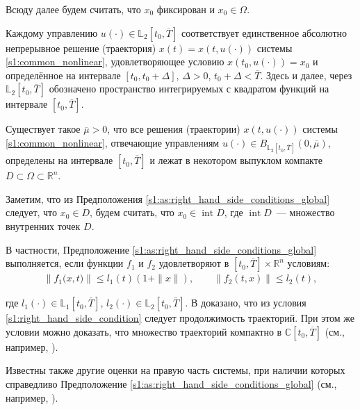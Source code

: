 \documentclass[../main.tex]{subfiles}
\begin{document}
Всюду далее будем считать, что $x_0$ фиксирован и $x_0 \in \Omega $. 
 
Каждому управлению $ u(\cdot) \in \mathbb{L}_2[t_0, \overline{T}] $ соответствует единственное абсолютно непрерывное решение (траектория) $ x(t)=x(t,u(\cdot)) $ системы \eqref{s1:common_nonlinear}, удовлетворяющее условию $ x(t_0, u(\cdot)) = x_0$ и определённое на интервале $ [t_0, t_0 + \Delta] $, $\Delta > 0$, $ t_0 + \Delta < \overline{T}$.
Здесь и далее, через $\mathbb{L}_2[t_0, \overline{T}] $ обозначено пространство интегрируемых с квадратом функций на интервале $[t_0, \overline{T}]$. 

\begin{assumption}\label{s1:as:right_hand_side_conditions_global}
 Существует такое $\overline{\mu} > 0 $, что все решения (траектории) $ x(t, u(\cdot)) $ системы \eqref{s1:common_nonlinear}, отвечающие управлениям $u(\cdot) \in B_{\mathbb{L}_2[t_0, \overline{T}]}(0,\overline{\mu})$, определены на интервале $ [t_0,\overline{T}] $ и лежат в некотором выпуклом компакте $D \subset \Omega \subset \mathbb{R}^n$. 
\end{assumption}
 
Заметим, что из Предположения \ref{s1:as:right_hand_side_conditions_global} следует, что $x_0 \in D$, будем считать, что $x_0 \in \operatorname{int} D$, где $\operatorname{int} D $~--- множество внутренних точек $D$.

В частности, Предположение \ref{s1:as:right_hand_side_conditions_global} выполняется, если функции $f_1$ и $f_2$ удовлетворяют в $ [t_0, \overline{T}] \times \mathbb{R}^n$ условиям:
\begin{gather}\label{s1:right_hand_side_condition}
 \left\|f_1\big(x,t\big) \right\| \leqslant l_1(t) (1 + \|x\|), \qquad \left\| f_2(t,x) \right\| \leqslant l_2(t), 
\end{gather}
 
где $ l_1(\cdot) \in \mathbb{L}_1[t_0, \overline{T}] $, $ l_2(\cdot) \in \mathbb{L}_2[t_0, \overline{T}]$.
В \cite[Теорема 5]{Filippov2} доказано, что из условия \eqref{s1:right_hand_side_condition} следует продолжимость траекторий. 
При этом же условии можно доказать, что множество траекторий компактно в $\mathbb{C}[t_0, \overline{T}]$ (см., например, \cite{GusZyk, Guseinov2022}).
 
Известны также другие оценки на правую часть системы, при наличии которых справедливо Предположение \ref{s1:as:right_hand_side_conditions_global} (см., например, \cite{Filippov2, Guseinov2010}).
 
\end{document}
